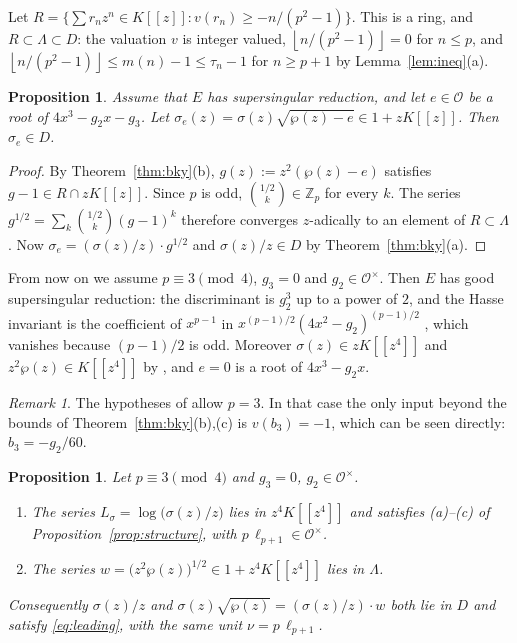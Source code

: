 \documentclass[11pt]{amsart}
\newtheorem{proposition}[theorem]{Proposition}
\theoremstyle{definition}
\theoremstyle{remark}
\newtheorem{remark}[theorem]{Remark}
\newcommand{\Z}{\mathbb{Z}}
\newcommand{\cO}{\mathcal{O}}
\newcommand{\fl}[1]{\left\lfloor #1 \right\rfloor}
\begin{document}
Let $R=\{\sum r_nz^n\in K[[z]]:v(r_n)\ge-n/(p^2-1)\}$. This is a ring, and
$R\subset\Lambda\subset D$: the valuation $v$ is integer valued, $\fl{n/(p^2-1)}=0$ for $n\le p$,
and $\fl{n/(p^2-1)}\le m(n)-1\le\tau_n-1$ for $n\ge p+1$ by Lemma~\ref{lem:ineq}(a).

\begin{proposition}\label{prop:general}
Assume that $E$ has supersingular reduction, and let $e\in\cO$ be a root of $4x^3-g_2x-g_3$. Let
$\sigma_e(z)=\sigma(z)\sqrt{\wp(z)-e}\in1+zK[[z]]$. Then $\sigma_e\in D$.
\end{proposition}

\begin{proof}
By Theorem~\ref{thm:bky}(b), $g(z):=z^2(\wp(z)-e)$ satisfies $g-1\in R\cap zK[[z]]$. Since $p$
is odd, $\binom{1/2}{k}\in\Z_p$ for every $k$. The series $g^{1/2}=\sum_k\binom{1/2}{k}(g-1)^k$
therefore converges $z$-adically to an element of $R\subset\Lambda$. Now $\sigma_e=(\sigma(z)/z)\cdot g^{1/2}$ and $\sigma(z)/z\in D$ by
Theorem~\ref{thm:bky}(a).
\end{proof}

From now on we assume $p\equiv3\pmod4$, $g_3=0$ and $g_2\in\cO^\times$. Then $E$ has good
supersingular reduction: the discriminant is $g_2^3$ up to a power of $2$, and the Hasse invariant
is the coefficient of $x^{p-1}$ in $x^{(p-1)/2}(4x^2-g_2)^{(p-1)/2}$
\cite[Chapter~V, Theorem~4.1]{Silverman}, which vanishes because $(p-1)/2$ is odd. Moreover $\sigma(z)\in zK[[z^4]]$ and $z^2\wp(z)\in K[[z^4]]$ by
\cite[(3)]{BKY}, and $e=0$ is a root of $4x^3-g_2x$.

\begin{remark}\label{rem:three}
The hypotheses of \cite{BKY} allow $p=3$. In that case the only input beyond the bounds of
Theorem~\ref{thm:bky}(b),(c) is $v(b_3)=-1$, which can be seen directly: $b_3=-g_2/60$.
\end{remark}

\begin{proposition}\label{prop:verify}
Let $p\equiv3\pmod4$ and $g_3=0$, $g_2\in\cO^\times$.
\begin{enumerate}
\item[(1)] The series $L_\sigma=\log\bigl(\sigma(z)/z\bigr)$ lies in $z^4K[[z^4]]$ and satisfies
\textup{(a)--(c)} of Proposition~\ref{prop:structure}, with $p\,\ell_{p+1}\in\cO^\times$.
\item[(2)] The series $w=\bigl(z^2\wp(z)\bigr)^{1/2}\in1+z^4K[[z^4]]$ lies in $\Lambda$.
\end{enumerate}
Consequently $\sigma(z)/z$ and $\sigma(z)\sqrt{\wp(z)}=(\sigma(z)/z)\cdot w$ both lie in $D$ and
satisfy \eqref{eq:leading}, with the same unit $\nu=p\,\ell_{p+1}$.
\end{proposition}
\end{document}
